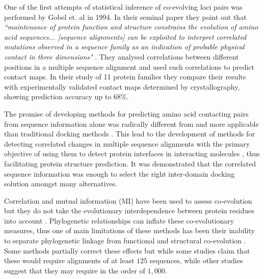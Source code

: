 One of the first attempts of statistical inference of co-evolving loci pairs was performed by Gobel et. al in 1994.
In their seminal paper they point out that \textit{``maintenance of protein function and structure constrains the evolution of amino acid sequences... [sequence alignments] can be exploited to interpret correlated mutations observed in a sequence family as an indication of probable physical contact in three dimensions"} \cite{gobel1994correlated}. 
They  analysed correlations between different positions in a multiple sequence alignment and used such correlations to predict contact maps.
In their study of 11 protein families they compare their results with experimentally validated contact maps determined by crystallography, showing prediction accuracy up to $68\%$.

The promise of developing methods for predicting amino acid contacting pairs from sequence information alone was radically different from and more applicable than traditional docking methods \cite{pazos1997correlated}.
This lead to the development of methods for detecting correlated changes in multiple sequence alignments with the primary objective of using them to detect protein interfaces in interacting molecules \cite{pazos1997correlated}, thus facilitating protein structure prediction.
It was demonstrated that the correlated sequence information was enough to select the right inter-domain docking solution amongst many alternatives.

Correlation and mutual information (MI) have been used to assess co-evolution but they do not take the evolutionary interdependence between protein residues into account \cite{fares2006novel}.
Phylogenetic relationships can inflate these co-evolutionary measures, thus one of main limitations of these methods has been their inability to separate phylogenetic linkage from functional and structural co-evolution \cite{fares2006novel}.
Some methods partially correct these effects but while some studies \cite{gloor2005mutual} claim that these would require alignments of at least $125$ sequences, while other studies \cite{morcos2011direct} suggest that they may require in the order of $1,000$.

